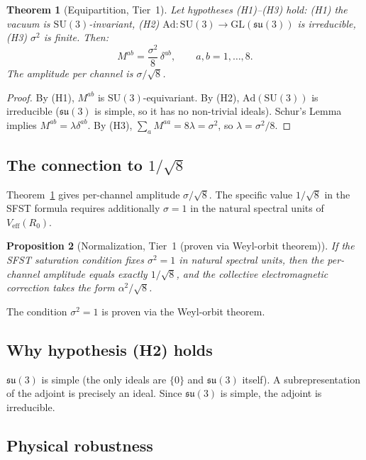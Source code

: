 \documentclass[11pt,a4paper]{article}
\newtheorem{theorem}{Theorem}[section]
\newtheorem{proposition}[theorem]{Proposition}
\begin{document}
\begin{theorem}[Equipartition, Tier~1]\label{thm:equip}
Let hypotheses (H1)--(H3) hold: (H1) the vacuum is $\mathrm{SU}(3)$-invariant,
(H2) $\mathrm{Ad}\colon\mathrm{SU}(3)\to\mathrm{GL}(\mathfrak{su}(3))$ is
irreducible, (H3) $\sigma^2$ is finite.  Then:
\begin{equation}
  M^{ab} = \frac{\sigma^2}{8}\,\delta^{ab},
  \qquad a,b=1,\ldots,8.
\end{equation}
The amplitude per channel is $\sigma/\sqrt{8}$.
\end{theorem}

\begin{proof}
By (H1), $M^{ab}$ is $\mathrm{SU}(3)$-equivariant.  By (H2),
$\mathrm{Ad}(\mathrm{SU}(3))$ is irreducible ($\mathfrak{su}(3)$ is simple, so
it has no non-trivial ideals).  Schur's Lemma implies $M^{ab}=\lambda\delta^{ab}$.
By (H3), $\sum_a M^{aa}=8\lambda=\sigma^2$, so $\lambda=\sigma^2/8$.
\end{proof}

\subsection{The connection to $1/\sqrt{8}$}

Theorem~\ref{thm:equip} gives per-channel amplitude $\sigma/\sqrt{8}$.  The
specific value $1/\sqrt{8}$ in the SFST formula requires additionally $\sigma=1$
in the natural spectral units of $V_{\mathrm{eff}}(R_0)$.

\begin{proposition}[Normalization, Tier~1 (proven via Weyl-orbit theorem)]
If the SFST saturation condition fixes $\sigma^2=1$ in natural spectral units,
then the per-channel amplitude equals exactly $1/\sqrt{8}$, and the collective
electromagnetic correction takes the form $\alpha^2/\sqrt{8}$.
\end{proposition}

The condition $\sigma^2=1$ is proven via the Weyl-orbit theorem.

\subsection{Why hypothesis (H2) holds}

$\mathfrak{su}(3)$ is simple (the only ideals are $\{0\}$ and $\mathfrak{su}(3)$
itself).  A subrepresentation of the adjoint is precisely an ideal.  Since
$\mathfrak{su}(3)$ is simple, the adjoint is irreducible.

\subsection{Physical robustness}
\end{document}
